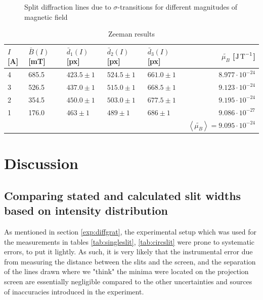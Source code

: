 \documentclass[11pt,a4paper]{article}
\begin{document}
\begin{figure}[H]
          \caption{Split diffraction lines due to $\sigma$-transitions for different magnitudes of magnetic field}
          \label{fig:zeeman_pics}
      \end{figure}

      \begin{table}[H]
        \center
        \caption{Zeeman results}
        \begin{tabular}{ l  l  l  l  l  r }
          $I$ [A] & $\bar B(I)$ [mT] & $\bar d_1(I)$ [px] & $\bar d_2(I)$ [px] & $\bar d_3(I)$ [px] & $\tilde{\mu_B}$ [$\textup J\,\textup T^{-1}$] \\ \hline

          4 & 685.5 & $423.5 \pm 1$ & $524.5 \pm 1$ & $661.0 \pm 1$ & $8.977\cdot 10^{-24}$ \\
          3 & 526.5 & $437.0 \pm 1$ & $515.0 \pm 1$ & $668.5 \pm 1$ & $9.123\cdot 10^{-24}$ \\ 
          2 & 354.5 & $450.0 \pm 1$ & $503.0 \pm 1$ & $677.5 \pm 1$ & $9.195\cdot 10^{-24}$ \\ 
          1 & 176.0 & $463 \pm 1$ & $489 \pm 1$ & $686 \pm 1$ & $9.086\cdot 10^{-27}$ \\  \hline
            &       &   &     &     &     $\left< \tilde{\mu_B}\right>= 9.095\cdot 10^{-24}$
        \end{tabular}
        \label{tab:zeeman_table}
    \end{table}



\section{\label{sect:discuss}Discussion}
  \subsection{Comparing stated and calculated slit widths based on intensity distribution}
    As mentioned in section \ref{exp:diffgrat}, the experimental setup which was used for the measurements in tables \ref{tab:singleslit}, \ref{tab:circslit} were prone to systematic errors, to put it lightly. As such, it is very likely that the instrumental error due from measuring the distance between the slits and the screen, and the separation of the lines drawn where we "think" the minima were located on the projection screen are essentially negligible compared to the other uncertainties and sources of inaccuracies introduced in the experiment. 
\end{document}
